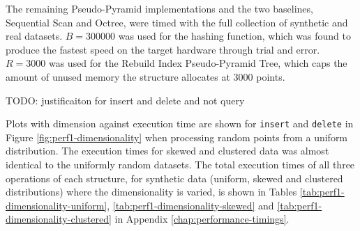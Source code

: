 The remaining Pseudo-Pyramid implementations and the two baselines, Sequential Scan and Octree, were timed with the full collection of synthetic and real datasets. $B = 300000$ was used for the hashing function, which was found to produce the fastest speed on the target hardware through trial and error. $R=3000$ was used for the Rebuild Index Pseudo-Pyramid Tree, which caps the amount of unused memory the structure allocates at 3000 points.

TODO: justificaiton for insert and delete and not query

Plots with dimension against execution time are shown for \texttt{insert} and \texttt{delete} in Figure \ref{fig:perf1-dimensionality} when processing random points from a uniform distribution. The execution times for skewed and clustered data was almost identical to the uniformly random datasets. The total execution times of all three operations of each structure, for synthetic data (uniform, skewed and clustered distributions) where the dimensionality is varied, is shown in Tables \ref{tab:perf1-dimensionality-uniform}, \ref{tab:perf1-dimensionality-skewed} and \ref{tab:perf1-dimensionality-clustered} in Appendix \ref{chap:performance-timings}.

